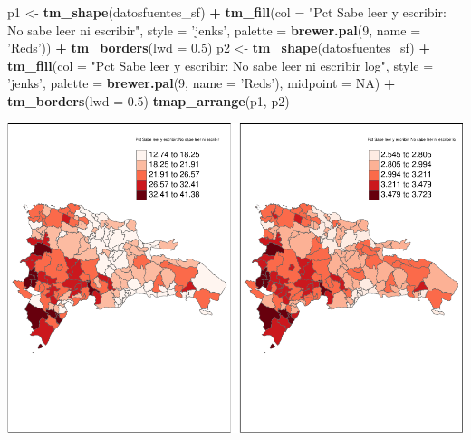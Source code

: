 \documentclass[11pt,]{article}
\newenvironment{Shaded}{\begin{snugshade}}{\end{snugshade}}
\newcommand{\KeywordTok}[1]{\textcolor[rgb]{0.13,0.29,0.53}{\textbf{#1}}}
\newcommand{\DataTypeTok}[1]{\textcolor[rgb]{0.13,0.29,0.53}{#1}}
\newcommand{\DecValTok}[1]{\textcolor[rgb]{0.00,0.00,0.81}{#1}}
\newcommand{\FloatTok}[1]{\textcolor[rgb]{0.00,0.00,0.81}{#1}}
\newcommand{\StringTok}[1]{\textcolor[rgb]{0.31,0.60,0.02}{#1}}
\newcommand{\OtherTok}[1]{\textcolor[rgb]{0.56,0.35,0.01}{#1}}
\newcommand{\OperatorTok}[1]{\textcolor[rgb]{0.81,0.36,0.00}{\textbf{#1}}}
\newcommand{\NormalTok}[1]{#1}
\begin{document}
\begin{Shaded}
\begin{Highlighting}[]
\NormalTok{p1 <-}\StringTok{ }\KeywordTok{tm_shape}\NormalTok{(datosfuentes_sf) }\OperatorTok{+}
\StringTok{  }\KeywordTok{tm_fill}\NormalTok{(}\DataTypeTok{col =} \StringTok{"Pct Sabe leer y escribir: No sabe leer ni escribir"}\NormalTok{, }\DataTypeTok{style =} \StringTok{'jenks'}\NormalTok{, }\DataTypeTok{palette =} \KeywordTok{brewer.pal}\NormalTok{(}\DecValTok{9}\NormalTok{, }\DataTypeTok{name =} \StringTok{'Reds'}\NormalTok{)) }\OperatorTok{+}
\StringTok{  }\KeywordTok{tm_borders}\NormalTok{(}\DataTypeTok{lwd =} \FloatTok{0.5}\NormalTok{)}
\NormalTok{p2 <-}\StringTok{ }\KeywordTok{tm_shape}\NormalTok{(datosfuentes_sf) }\OperatorTok{+}
\StringTok{  }\KeywordTok{tm_fill}\NormalTok{(}\DataTypeTok{col =} \StringTok{"Pct Sabe leer y escribir: No sabe leer ni escribir log"}\NormalTok{, }\DataTypeTok{style =} \StringTok{'jenks'}\NormalTok{,}
          \DataTypeTok{palette =} \KeywordTok{brewer.pal}\NormalTok{(}\DecValTok{9}\NormalTok{, }\DataTypeTok{name =} \StringTok{'Reds'}\NormalTok{), }\DataTypeTok{midpoint =} \OtherTok{NA}\NormalTok{) }\OperatorTok{+}
\StringTok{  }\KeywordTok{tm_borders}\NormalTok{(}\DataTypeTok{lwd =} \FloatTok{0.5}\NormalTok{)}
\KeywordTok{tmap_arrange}\NormalTok{(p1, p2)}
\end{Highlighting}
\end{Shaded}

\includegraphics{proyecto_files/figure-latex/unnamed-chunk-6-1.pdf}
\end{document}
